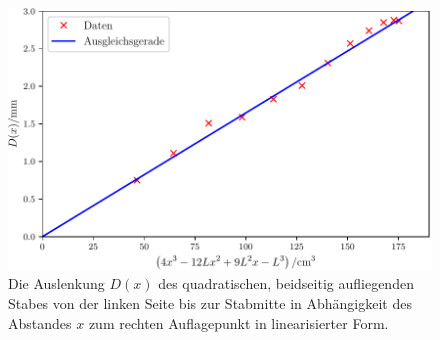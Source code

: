\begin{figure}
	\centering
	\includegraphics[scale=.8]{content/images/StabQuadratBeidseitig3.pdf}
	\caption{Die Auslenkung $D(x)$ des quadratischen, beidseitig aufliegenden Stabes von der linken Seite bis zur Stabmitte in Abhängigkeit des Abstandes $x$ zum rechten Auflagepunkt in linearisierter Form.}
	\label{fig:beidseitiglinear2}
\end{figure}
